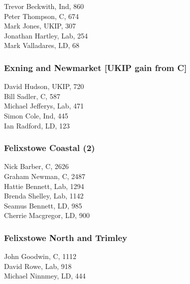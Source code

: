 \documentclass[a4paper,openany,10pt]{book}
\begin{document}
Trevor Beckwith, Ind, 860\\
Peter Thompson, C, 674\\
Mark Jones, UKIP, 307\\
Jonathan Hartley, Lab, 254\\
Mark Valladares, LD, 68\\


\subsubsection*{Exning and Newmarket \hspace*{\fill}\nolinebreak[1]%
\enspace\hspace*{\fill}
[UKIP gain from C]}



David Hudson, UKIP, 720\\
Bill Sadler, C, 587\\
Michael Jefferys, Lab, 471\\
Simon Cole, Ind, 445\\
Ian Radford, LD, 123\\


\subsubsection*{Felixstowe Coastal (2)}



Nick Barber, C, 2626\\
Graham Newman, C, 2487\\
Hattie Bennett, Lab, 1294\\
Brenda Shelley, Lab, 1142\\
Seamus Bennett, LD, 985\\
Cherrie Macgregor, LD, 900\\


\subsubsection*{Felixstowe North and Trimley}



John Goodwin, C, 1112\\
David Rowe, Lab, 918\\
Michael Ninnmey, LD, 444\\
\end{document}
